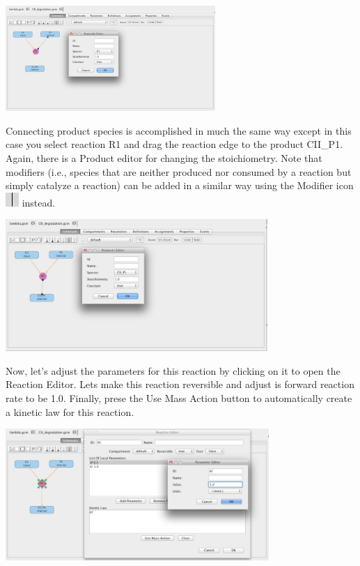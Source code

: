 \documentclass[titlepage,11pt]{article}
\begin{document}
\begin{center}
\includegraphics[height=40mm]{screenshots/reactant}
\end{center}

Connecting product species is accomplished in much the same way except in this case you select reaction R1 and drag the reaction edge to the product CII\_P1.  Again, there is a Product editor for changing the stoichiometry.  Note that modifiers (i.e., species that are neither produced nor consumed by a reaction but simply catalyze a reaction) can be added in a similar way using the Modifier icon \includegraphics{../gui/icons/modelview/modifier_selected} instead.

\begin{center}
\includegraphics[height=50mm]{screenshots/product}
\end{center}

Now, let's adjust the parameters for this reaction by clicking on it to open the Reaction Editor.  Lets make this reaction reversible and adjust is forward reaction rate to be 1.0.  Finally, prese the Use Mass Action button to automatically create a kinetic law for this reaction.

\begin{center}
\includegraphics[height=50mm]{screenshots/localParam}
\end{center}
\end{document}

